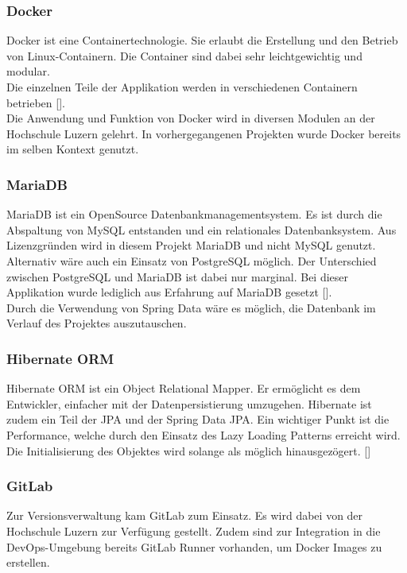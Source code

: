 \subsubsection{Docker}
Docker ist eine Containertechnologie. Sie erlaubt die Erstellung und den Betrieb von Linux-Containern. Die Container sind dabei sehr leichtgewichtig und modular.\\
Die einzelnen Teile der Applikation werden in verschiedenen Containern betrieben [\cite{docker}].\\
Die Anwendung und Funktion von Docker wird in diversen Modulen an der Hochschule Luzern gelehrt. In vorhergegangenen Projekten wurde Docker bereits im selben Kontext genutzt. 

\subsubsection{MariaDB}\label{mariadb}
MariaDB ist ein OpenSource Datenbankmanagementsystem. Es ist durch die Abspaltung von MySQL entstanden und ein relationales Datenbanksystem. 
Aus Lizenzgründen wird in diesem Projekt MariaDB und nicht MySQL genutzt. Alternativ wäre auch ein Einsatz von PostgreSQL möglich. Der Unterschied zwischen PostgreSQL und MariaDB ist dabei nur marginal. Bei dieser Applikation wurde lediglich aus Erfahrung auf MariaDB gesetzt [\cite{mariadbVsPostgresql}]. \\
Durch die Verwendung von Spring Data wäre es möglich, die Datenbank im Verlauf des Projektes auszutauschen. 

\subsubsection{Hibernate ORM}
Hibernate ORM ist ein Object Relational Mapper. 
Er ermöglicht es dem Entwickler, einfacher mit der Datenpersistierung umzugehen. Hibernate ist zudem ein Teil der \ac{JPA} und der Spring Data JPA. 
Ein wichtiger Punkt ist die Performance, welche durch den Einsatz des Lazy Loading Patterns erreicht wird. Die Initialisierung des Objektes wird solange als möglich hinausgezögert. [\cite{hibernateORM}]

\subsubsection{\gls{GitLab}}
Zur Versionsverwaltung kam \gls{GitLab} zum Einsatz. Es wird dabei von der Hochschule Luzern zur Verfügung gestellt. Zudem sind zur Integration in die \gls{DevOps}-Umgebung bereits GitLab Runner vorhanden, um Docker Images zu erstellen. 

